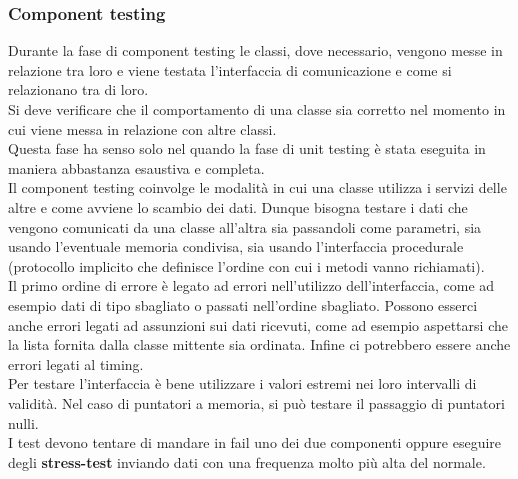 \subsubsection{Component testing}
Durante la fase di component testing le classi, dove necessario, vengono messe in relazione tra loro e viene testata l'interfaccia di comunicazione e come si relazionano tra di loro.\\
Si deve verificare che il comportamento di una classe sia corretto nel momento in cui viene messa in relazione con altre classi.\\
Questa fase ha senso solo nel quando la fase di unit testing è stata eseguita in maniera abbastanza esaustiva e completa.\\
Il component testing coinvolge le modalità in cui una classe utilizza i servizi delle altre e come avviene lo scambio dei dati.
Dunque bisogna testare i dati che vengono comunicati da una classe all'altra sia passandoli come parametri, sia usando l'eventuale memoria condivisa, sia usando l'interfaccia procedurale (protocollo implicito che definisce l'ordine con cui i metodi vanno richiamati).\\
Il primo ordine di errore è legato ad errori nell'utilizzo dell'interfaccia, come ad esempio dati di tipo sbagliato o passati nell'ordine sbagliato.
Possono esserci anche errori legati ad assunzioni sui dati ricevuti, come ad esempio aspettarsi che la lista fornita dalla classe mittente sia ordinata.
Infine ci potrebbero essere anche errori legati al timing.\\
Per testare l'interfaccia è bene utilizzare i valori estremi nei loro intervalli di validità.
Nel caso di puntatori a memoria, si può testare il passaggio di puntatori nulli.\\
I test devono tentare di mandare in fail uno dei due componenti oppure eseguire degli \textbf{stress-test} inviando dati con una frequenza molto più alta del normale.

